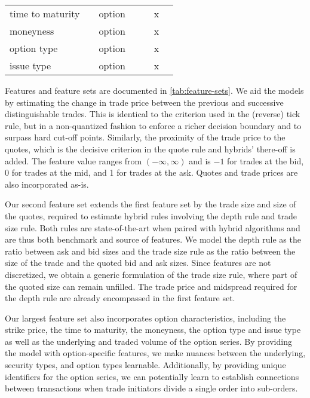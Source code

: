 \begin{ThreePartTable}
\begin{longtable}{@{}lllllll@{}}
            time to maturity        &                                                                                                  & option               & &  & x           \\
            moneyness               &                                                                                                  & option               & &  & x           \\
            option type             &                                                                                                  & option               & &  & x           \\
            issue type              &                                                                                                  & option               & &  & x           \\ \bottomrule
        \end{longtable}
\end{ThreePartTable}

Features and feature sets are documented in \cref{tab:feature-sets}. 
We aid the models by estimating the change in trade price between the previous and successive distinguishable trades. This is identical to the criterion used in the (reverse) tick rule, but in a non-quantized fashion to enforce a richer decision boundary and to surpass hard cut-off points. Similarly, the proximity of the trade price to the quotes, which is the decisive criterion in the quote rule and hybrids' there-off is added. The feature value ranges from $\left(-\infty,\infty\right)$ and is $-1$ for trades at the bid, 0 for trades at the mid, and 1 for trades at the ask. Quotes and trade prices are also incorporated as-is.

Our second feature set extends the first feature set by the trade size and size of the quotes, required to estimate hybrid rules involving the depth rule and trade size rule. Both rules are state-of-the-art when paired with hybrid algorithms and are thus both benchmark and source of features. We model the depth rule as the ratio between ask and bid sizes and the trade size rule as the ratio between the size of the trade and the quoted bid and ask sizes. Since features are not discretized, we obtain a generic formulation of the trade size rule, where part of the quoted size can remain unfilled. The trade price and midspread required for the depth rule are already encompassed in the first feature set.

Our largest feature set also incorporates option characteristics, including the strike price, the time to maturity, the moneyness, the option type and issue type as well as the underlying and traded volume of the option series. By providing the model with option-specific features, we make nuances between the underlying, security types, and option types learnable. Additionally, by providing unique identifiers for the option series, we can potentially learn to establish connections between transactions when trade initiators divide a single order into sub-orders.

